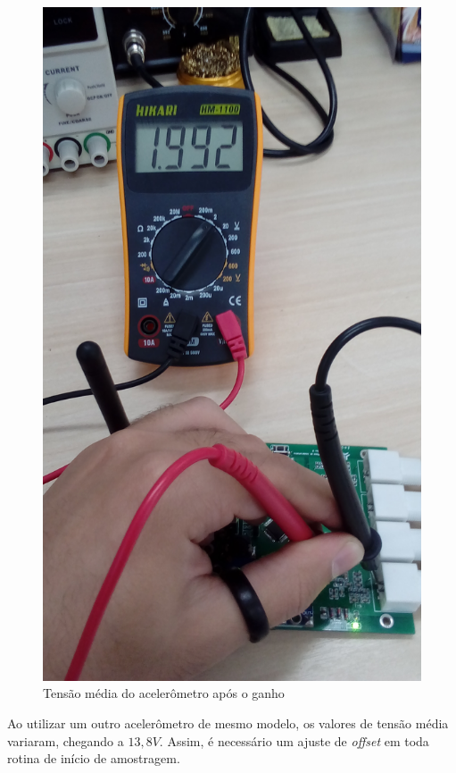 \documentclass[
	12pt,				%
	openright,			%
	twoside,			%
	a4paper,			%
	english,			%
	french,				%
	spanish,			%
	brazil,				%
	]{abntex2}
\begin{document}
\begin{figure}[!ht]
\begin{minipage}{0.4\linewidth}
					\includegraphics[angle=-90,width = \linewidth]{../Fotos/tensaoAccG.jpg}
					\caption{Tensão média do acelerômetro após o ganho}
				\end{minipage}
			\end{figure}

			Ao utilizar um outro acelerômetro de mesmo modelo, os
			valores de tensão média variaram, chegando a $13,8V$. Assim,
			é necessário um ajuste de \textit{offset} em toda rotina de
			início de amostragem.
\end{document}
